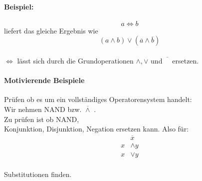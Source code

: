 \documentclass[a4paper]{scrartcl}
\begin{document}
				 \paragraph{Beispiel:}
				 \[ a \iff b \] liefert das gleiche Ergebnis wie \[ (a \wedge b) \vee ( \overline{a} \wedge\overline{b}) \]\\
				 \( \iff \) lässt sich durch die Grundoperationen \(  \wedge, \vee \) und \( \overline{\phantom{A}} \) ersetzen.\\
				 
				 \paragraph{Motivierende Beispiele}
				 Prüfen ob es um ein vollständiges Operatorensystem handelt:\\
				 Wir nehmen NAND bzw. \(  \overline{\wedge}   \) .\\
				 Zu prüfen ist ob NAND,\\
				 Konjunktion, Disjunktion, Negation ersetzen kann. Also für:\\
				 \begin{align*}
				 	&\overline{x}\\
				 	x &\wedge y \\
				 	x &\vee y \\
				 \end{align*}
				 
				 Substitutionen finden.\\
\end{document}

